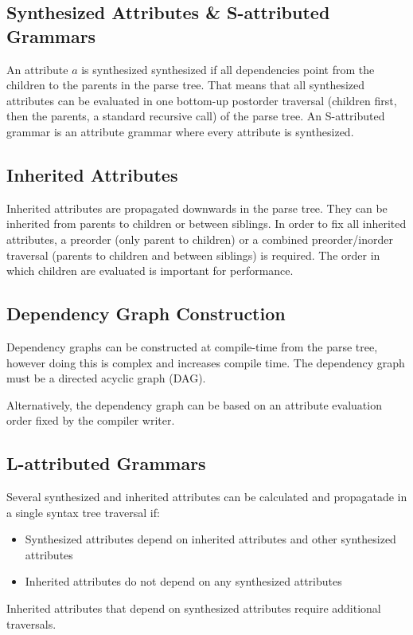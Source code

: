 \documentclass{article}
\begin{document}
\subsection{Synthesized Attributes \& S-attributed Grammars}
An attribute $a$ is synthesized synthesized if all dependencies point from the children to the parents in the parse tree.
That means that all synthesized attributes can be evaluated in one bottom-up postorder traversal (children first, then the parents, a standard recursive call) of the parse tree.
An S-attributed grammar is an attribute grammar where every attribute is synthesized.

\subsection{Inherited Attributes}
Inherited attributes are propagated downwards in the parse tree.
They can be inherited from parents to children or between siblings.
In order to fix all inherited attributes, a preorder (only parent to children) or a combined preorder/inorder traversal (parents to children and between siblings) is required.
The order in which children are evaluated is important for performance.

\subsection{Dependency Graph Construction}
Dependency graphs can be constructed at compile-time from the parse tree, however doing this is complex and increases compile time.
The dependency graph must be a directed acyclic graph (DAG).

Alternatively, the dependency graph can be based on an attribute evaluation order fixed by the compiler writer.

\subsection{L-attributed Grammars}
Several synthesized and inherited attributes can be calculated and propagatade in a single syntax tree traversal if:
\begin{itemize}
	\item Synthesized attributes depend on inherited attributes and other synthesized attributes
	\item Inherited attributes do not depend on any synthesized attributes
\end{itemize}
Inherited attributes that depend on synthesized attributes require additional traversals.
\end{document}
